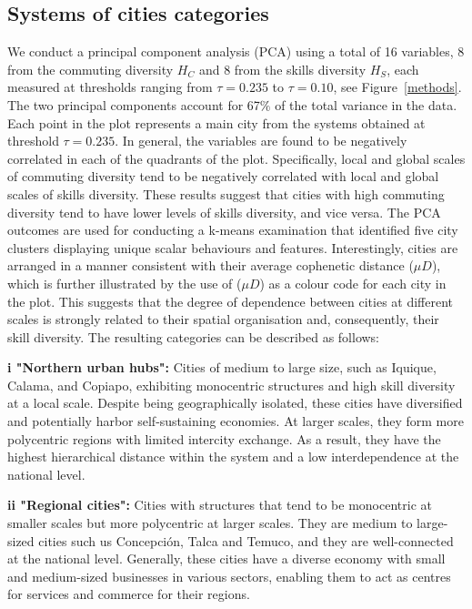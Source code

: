 \documentclass[11pt, a4paper]{article}
\begin{document}
\subsection{Systems of cities categories}

We conduct a principal component analysis (PCA) using a total of 16 variables, 8 from the commuting diversity $H_{C}$ and 8 from the skills diversity $H_{S}$, each measured at thresholds ranging from $\tau= 0.235$ to $\tau=0.10$, see Figure~\ref{methods}. The two principal components account for 67$\%$ of the total variance in the data. Each point in the plot represents a main city from the systems obtained at threshold $\tau=0.235$. In general, the variables are found to be negatively correlated in each of the quadrants of the plot. Specifically, local and global scales of commuting diversity tend to be negatively correlated with local and global scales of skills diversity. These results suggest that cities with high commuting diversity tend to have lower levels of skills diversity, and vice versa. The PCA outcomes are used for conducting a k-means examination that identified five city clusters displaying unique scalar behaviours and features. Interestingly, cities are arranged in a manner consistent with their average cophenetic distance ($\mu D$), which is further illustrated by the use of ($\mu D$) as a colour code for each city in the plot. This suggests that the degree of dependence between cities at different scales is strongly related to their spatial organisation and, consequently, their skill diversity. The resulting categories can be described as follows:





\textbf{i "Northern urban hubs":} Cities of medium to large size, such as Iquique, Calama, and Copiapo, exhibiting monocentric structures and high skill diversity at a local scale. Despite being geographically isolated, these cities have diversified and potentially harbor self-sustaining economies. At larger scales, they form more polycentric regions with limited intercity exchange. As a result, they have the highest hierarchical distance within the system and a low interdependence at the national level.

\textbf{ii "Regional cities":} Cities with structures that tend to be monocentric at smaller scales but more polycentric at larger scales. They are medium to large-sized cities such us Concepci\'on, Talca and Temuco, and they are well-connected at the national level. Generally, these cities have a diverse economy with small and medium-sized businesses in various sectors, enabling them to act as centres for services and commerce for their regions.
\end{document}
